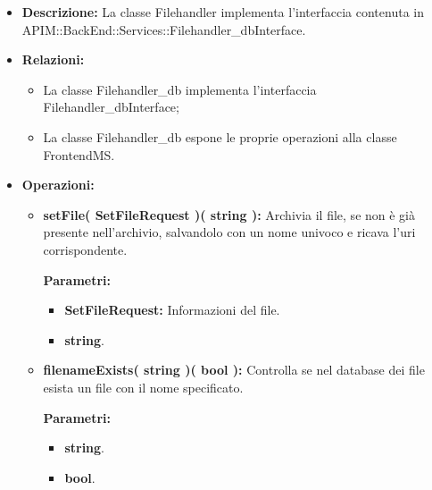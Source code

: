 \begin{itemize}
	\item \textbf{Descrizione:} La classe Filehandler implementa l'interfaccia contenuta in APIM::BackEnd::Services::Filehandler\_dbInterface.
	\item \textbf{Relazioni:}
		\begin{itemize}
			\item La classe Filehandler\_db implementa l'interfaccia Filehandler\_dbInterface;
			\item La classe Filehandler\_db espone le proprie operazioni alla classe FrontendMS.
		\end{itemize}
	\item \textbf{Operazioni:}
		\begin{itemize}
		
			\item \textbf{setFile( SetFileRequest )( string ):} Archivia il file, se non è già presente nell'archivio, salvandolo con un nome univoco e ricava l'uri corrispondente.
				\begin{description}
    				\item[\textbf{Parametri:}]
				\end{description}
				\begin{itemize}
					\item \textbf{SetFileRequest:} Informazioni del file.
					\item \textbf{string}.
				\end{itemize}
				
			\item \textbf{filenameExists( string )( bool ):} Controlla se nel database dei file esista un file con il nome specificato.
				\begin{description}
    				\item[\textbf{Parametri:}]
				\end{description}
				\begin{itemize}
					\item \textbf{string}.
					\item \textbf{bool}.
				\end{itemize}
				
		\end{itemize}
\end{itemize}